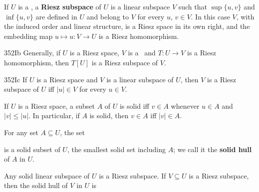  If $U$ is a \pols, a {\bf Riesz
subspace} of $U$ is a linear subspace $V$ such that $\sup\{u,v\}$ and
$\inf\{u,v\}$ are defined in $U$ and belong to $V$ for every $u$,
$v\in V$.   In this case $V$, with the induced order and linear structure, is a Riesz
space in its own right, and the embedding map $u\mapsto u:V\to U$ is a
Riesz homomorphism.
     
\spheader 352Ib Generally, if $U$ is a Riesz space, $V$ is a \pols\ and
$T:U\to V$ is a Riesz homomorphism, then $T[U]$ is a Riesz subspace of
$V$.
     
\spheader 352Ic If $U$ is a Riesz space and $V$ is a linear subspace of
$U$, then $V$ is a Riesz subspace of $U$ iff $|u|\in V$ for every
$u\in V$.   
     
 If $U$ is a Riesz space, a
subset $A$ of $U$ is solid iff
$v\in A$ whenever $u\in A$ and $|v|\le|u|$.      In particular, if $A$ is
solid, then $v\in A$ iff $|v|\in A$.
     
For any set $A\subseteq U$, the set
     
     
\noindent is a solid subset of $U$, the smallest solid set including
$A$;  we call it the {\bf solid hull} of $A$ in $U$.
     
Any solid linear subspace of $U$ is a Riesz subspace.   If $V\subseteq U$ is a Riesz subspace, 
then the solid hull of $V$ in $U$ is
     
     
